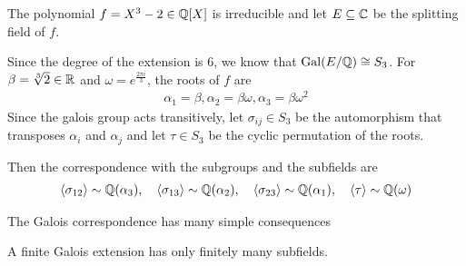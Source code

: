 \begin{ex}[]
	The polynomial $f = X^{3} - 2 \in \mathbb{Q}[X]$ is irreducible and let $E \subseteq \mathbb{C}$ be the splitting field of $f$.

	Since the degree of the extension is $6$, we know that $\operatorname{Gal}(E/\mathbb{Q}) \cong S_3$.
	For $\beta = \sqrt[3]{2} \in \mathbb{R}$ and $\omega = e^{\frac{2 \pi i }{3}}$, the roots of $f$ are
	\begin{align*}
		\alpha_1 = \beta, \alpha_2 = \beta \omega, \alpha_3 = \beta \omega^{2}
	\end{align*}
	Since the galois group acts transitively, let $\sigma_{ij} \in S_3$ be the automorphism that transposes $\alpha_i$ and $\alpha_j$ and let $\tau \in S_3$ be the cyclic permutation of the roots.

	Then the correspondence with the subgroups and the subfields are
	\begin{align*}
		\left<\sigma_{12}\right> \sim \mathbb{Q}(\alpha_3), \quad \left<\sigma_{13}\right> \sim \mathbb{Q}(\alpha_2), \quad \left<\sigma_{23}\right> \sim \mathbb{Q}(\alpha_1), \quad \left<\tau\right> \sim \mathbb{Q}(\omega)
	\end{align*}
\end{ex}

The Galois correspondence has many simple consequences
\begin{cor}[] \label{cor:4-18}
	A finite Galois extension has only finitely many subfields.
\end{cor}



